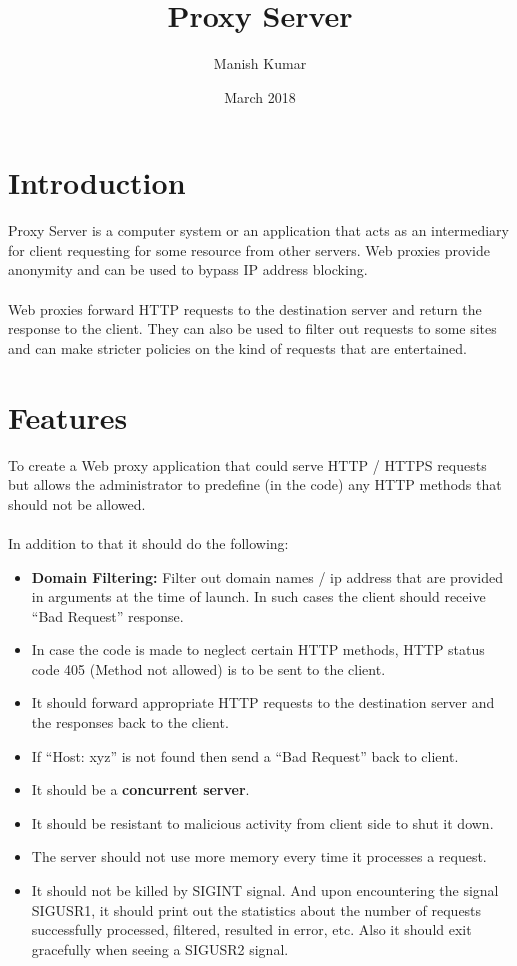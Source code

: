 \documentclass{article}
\title{Proxy Server}
\author{Manish Kumar}
\date{March 2018}
\begin{document}
\maketitle

\section{Introduction}
Proxy Server is a computer system or an application that acts as an intermediary for client requesting for some resource from other servers. Web proxies provide anonymity and can be used to bypass IP address blocking.\\\\
Web proxies forward HTTP requests to the destination server and return the response to the client. They can also be used to filter out requests to some sites and can make stricter policies on the kind of requests that are entertained.

\section{Features}
To create a Web proxy application that could serve HTTP / HTTPS  requests but allows the administrator to predefine (in the code) any HTTP methods that should not be allowed.\\\\

In addition to that it should do the following:
\begin{itemize}

\item \textbf{Domain Filtering:} Filter out domain names / ip address that are provided in arguments at the time of launch. In such cases the client should receive “Bad Request” response.
\item In case the code is made to neglect certain HTTP methods, HTTP status code 405 (Method not allowed) is to be sent to the client.
\item It should forward appropriate HTTP requests to the destination server and the responses back to the client.
\item If “Host: xyz” is not found then send a “Bad Request” back to client.
\item It should be a \textbf{concurrent server}.
\item It should be resistant to malicious activity from client side to shut it down.
\item The server should not use more memory every time it processes a request.
\item It should not be killed by SIGINT signal. And upon encountering the signal SIGUSR1, it should print out the statistics about the number of requests successfully processed, filtered, resulted in error, etc. Also it should exit gracefully when seeing a SIGUSR2 signal.

\end{itemize}
\end{document}
